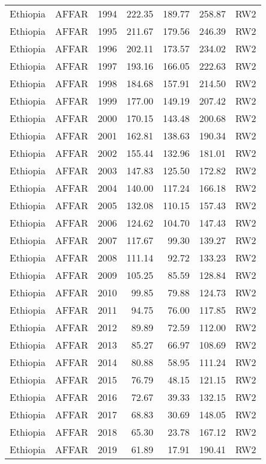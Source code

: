 \begin{longtable}{lllrrrl}
  Ethiopia & AFFAR & 1994 & 222.35 & 189.77 & 258.87 & RW2 \\ 
  Ethiopia & AFFAR & 1995 & 211.67 & 179.56 & 246.39 & RW2 \\ 
  Ethiopia & AFFAR & 1996 & 202.11 & 173.57 & 234.02 & RW2 \\ 
  Ethiopia & AFFAR & 1997 & 193.16 & 166.05 & 222.63 & RW2 \\ 
  Ethiopia & AFFAR & 1998 & 184.68 & 157.91 & 214.50 & RW2 \\ 
  Ethiopia & AFFAR & 1999 & 177.00 & 149.19 & 207.42 & RW2 \\ 
  Ethiopia & AFFAR & 2000 & 170.15 & 143.48 & 200.68 & RW2 \\ 
  Ethiopia & AFFAR & 2001 & 162.81 & 138.63 & 190.34 & RW2 \\ 
  Ethiopia & AFFAR & 2002 & 155.44 & 132.96 & 181.01 & RW2 \\ 
  Ethiopia & AFFAR & 2003 & 147.83 & 125.50 & 172.82 & RW2 \\ 
  Ethiopia & AFFAR & 2004 & 140.00 & 117.24 & 166.18 & RW2 \\ 
  Ethiopia & AFFAR & 2005 & 132.08 & 110.15 & 157.43 & RW2 \\ 
  Ethiopia & AFFAR & 2006 & 124.62 & 104.70 & 147.43 & RW2 \\ 
  Ethiopia & AFFAR & 2007 & 117.67 & 99.30 & 139.27 & RW2 \\ 
  Ethiopia & AFFAR & 2008 & 111.14 & 92.72 & 133.23 & RW2 \\ 
  Ethiopia & AFFAR & 2009 & 105.25 & 85.59 & 128.84 & RW2 \\ 
  Ethiopia & AFFAR & 2010 & 99.85 & 79.88 & 124.73 & RW2 \\ 
  Ethiopia & AFFAR & 2011 & 94.75 & 76.00 & 117.85 & RW2 \\ 
  Ethiopia & AFFAR & 2012 & 89.89 & 72.59 & 112.00 & RW2 \\ 
  Ethiopia & AFFAR & 2013 & 85.27 & 66.97 & 108.69 & RW2 \\ 
  Ethiopia & AFFAR & 2014 & 80.88 & 58.95 & 111.24 & RW2 \\ 
  Ethiopia & AFFAR & 2015 & 76.79 & 48.15 & 121.15 & RW2 \\ 
  Ethiopia & AFFAR & 2016 & 72.67 & 39.33 & 132.15 & RW2 \\ 
  Ethiopia & AFFAR & 2017 & 68.83 & 30.69 & 148.05 & RW2 \\ 
  Ethiopia & AFFAR & 2018 & 65.30 & 23.78 & 167.12 & RW2 \\ 
  Ethiopia & AFFAR & 2019 & 61.89 & 17.91 & 190.41 & RW2 \\ 

\end{longtable}
